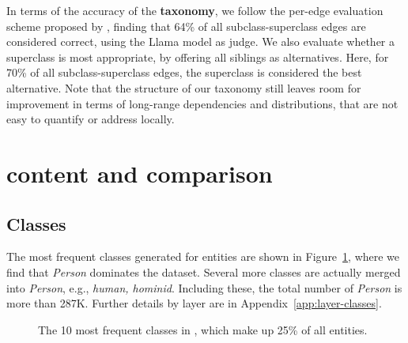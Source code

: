 In terms of the accuracy of the \textbf{taxonomy}, we follow the per-edge evaluation scheme proposed by \citet{bordea2016semeval}, finding that 64\% of all subclass-superclass edges are considered correct, using the Llama model as judge. We also evaluate whether a superclass is most appropriate, by offering all siblings as alternatives. Here, for 70\% of all subclass-superclass edges, the superclass is considered the best alternative. Note that the structure of our taxonomy still leaves room for improvement in terms of long-range dependencies and distributions, that are not easy to quantify or address locally.





\section{\ourkb{} content and comparison}
\label{sec:content-and-comparison}

\subsection{Classes} The most frequent classes generated for entities are shown in Figure~\ref{fig:frequent_classes}, where we find that \textit{Person} dominates the dataset. Several more classes are actually merged into \textit{Person}, e.g., \textit{human, hominid}. Including these, the total number of \textit{Person} is more than 287K. Further details by layer are in Appendix~\ref{app:layer-classes}. %

\begin{figure}[t]
\centering
\scriptsize
{}
\caption{The 10 most frequent classes in \ourkb, which make up 25\% of all entities.}
\label{fig:frequent_classes}
\end{figure}


